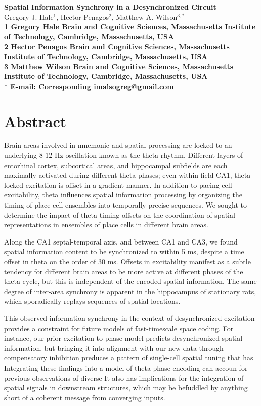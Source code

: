 \documentclass[10pt]{article}
\date{}
\begin{document}
\begin{flushleft}
{\Large
\textbf{Spatial Information Synchrony in a Desynchronized Circuit}
}
\\
Gregory J. Hale$^{1}$, 
Hector Penagos$^{2}$, 
Matthew A. Wilson$^{3,\ast}$
\\
\bf{1} Gregory Hale Brain and Cognitive Sciences, Massachusetts Institute of Technology, Cambridge, Massachusetts, USA
\\
\bf{2} Hector Penagos Brain and Cognitive Sciences, Massachusetts Institute of Technology, Cambridge, Massachusetts, USA
\\
\bf{3} Matthew Wilson Brain and Cognitive Sciences, Massachusetts Institute of Technology, Cambridge, Massachusetts, USA
\\
$\ast$ E-mail: Corresponding imalsogreg@gmail.com
\end{flushleft}

\section*{Abstract}
Brain areas involved in mnemonic and spatial processing are locked to an underlying 8-12 Hz oscillation known as the theta rhythm.  Different layers of entorhinal cortex, subcortical areas, and hippocampal subfields are each maximally activated during different theta phases; even within field CA1, theta-locked excitation is offset in a gradient manner.  In addition to pacing cell excitability, theta influences spatial information processing by organizing the timing of place cell ensembles into temporally precise sequences. We sought to determine the impact of theta timing offsets on the coordination of spatial representations in ensembles of place cells in different brain areas.

Along the CA1 septal-temporal axis, and between CA1 and CA3, we found spatial information content to be synchronized to within 5 ms, despite a time offset in theta on the order of 30 ms. Offsets in excitability manifest as a subtle tendency for different brain areas to be more active at different phases of the theta cycle, but this is independent of the encoded spatial information. The same degree of inter-area synchrony is apparent in the hippocampus of stationary rats, which sporadically replays sequences of spatial locations.

This observed information synchrony in the context of desynchronized excitation provides a constraint for future models of fast-timescale space coding. For instance, our prior excitation-to-phase model predicts desynchronized spatial information, but bringing it into alignment with our new data through compensatory inhibition preduces a pattern of single-cell spatial tuning that has 
Integrating these findings into a model of theta phase encoding can accoun for previous observations of diverse It also has implications for the integration of spatial signals in downstream structures, which may be befuddled by anything short of a coherent message from converging inputs.
\end{document}
